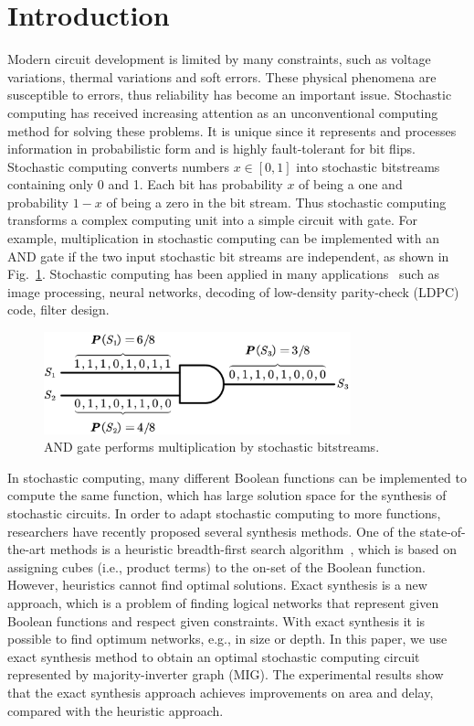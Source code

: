 \documentclass[conference,letterpaper]{IEEEtran}
\begin{document}
\section*{Introduction}
Modern circuit development is limited by many constraints, such as voltage variations, thermal variations and soft errors. These physical phenomena are susceptible to errors, thus reliability has become an important issue. Stochastic computing has received increasing attention as an unconventional computing method for solving these problems. It is unique since it represents and processes information in probabilistic form and is highly fault-tolerant for bit flips. Stochastic computing converts numbers $x\in[0,1]$ into stochastic bitstreams containing only 0 and 1. 
Each bit has probability $x$ of being a one and probability $1-x$ of being a zero in the bit stream. 
Thus stochastic computing transforms a complex computing unit into a simple circuit with gate. For example, multiplication in stochastic computing can be implemented with an AND gate if the two input stochastic bit streams are independent, as shown in Fig.~\ref{fig:sto}.  
Stochastic computing has been applied in many applications~\cite{1} such as image processing, neural networks, decoding of low-density parity-check (LDPC) code, filter design.

\begin{figure}[t]
	\centering
	\includegraphics[width=3.5in]{fig/AND3.pdf}	
	\caption{\label{fig:sto}AND gate performs multiplication by stochastic bitstreams.} \vspace{-2ex}
\end{figure}

In stochastic computing, many different Boolean functions can be implemented to compute the same function, which has large solution space for the synthesis of stochastic circuits. In order to adapt stochastic computing to more functions, researchers have recently proposed several synthesis methods. One of the state-of-the-art methods is a heuristic breadth-first search algorithm~\cite{2}, which is based on assigning
cubes (i.e., product terms) to the on-set of the Boolean function. However, heuristics cannot find optimal solutions. Exact synthesis is a new approach, which is a problem of finding logical networks that represent given Boolean functions and respect given constraints. With exact synthesis it is possible to find optimum networks, e.g., in size or depth. In this paper, we use exact synthesis method to obtain an optimal stochastic computing circuit represented by majority-inverter graph (MIG). The experimental results show that the exact synthesis approach achieves improvements on area and delay, compared with the heuristic approach.
\end{document}
